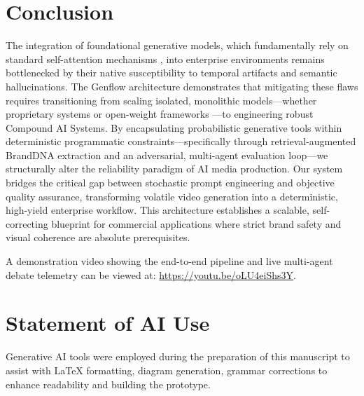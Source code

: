 \documentclass[sigconf,authordraft]{acmart}
\begin{document}
\section{Conclusion}

The integration of foundational generative models, which fundamentally rely on standard self-attention mechanisms \cite{vaswani2017attention}, into enterprise environments remains bottlenecked by their native susceptibility to temporal artifacts and semantic hallucinations. The Genflow architecture demonstrates that mitigating these flaws requires transitioning from scaling isolated, monolithic models---whether proprietary systems \cite{openai2023gpt4} or open-weight frameworks \cite{touvron2023llama}---to engineering robust Compound AI Systems. By encapsulating probabilistic generative tools within deterministic programmatic constraints---specifically through retrieval-augmented BrandDNA extraction and an adversarial, multi-agent evaluation loop---we structurally alter the reliability paradigm of AI media production. Our system bridges the critical gap between stochastic prompt engineering and objective quality assurance, transforming volatile video generation into a deterministic, high-yield enterprise workflow. This architecture establishes a scalable, self-correcting blueprint for commercial applications where strict brand safety and visual coherence are absolute prerequisites.

A demonstration video showing the end-to-end pipeline and live multi-agent debate telemetry can be viewed at: \url{https://youtu.be/oLU4eiShs3Y}.

\section*{Statement of AI Use}

Generative AI tools were employed during the preparation of this manuscript to assist with LaTeX formatting, diagram generation, grammar corrections to enhance readability and building the prototype.
\end{document}

